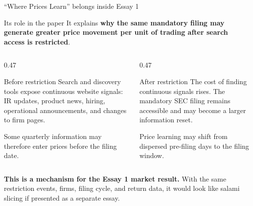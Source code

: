 \documentclass[aspectratio=169,10pt]{beamer}
\begin{document}
\begin{frame}[t]{``Where Prices Learn'' belongs inside Essay 1}
\begin{block}{Its role in the paper}
\large
It explains \textbf{why the same mandatory filing may generate greater price movement per unit of trading after search access is restricted}.
\end{block}

\small
\begin{columns}[T,onlytextwidth]
  \begin{column}{0.47\textwidth}
    \begin{exampleblock}{Before restriction}
      Search and discovery tools expose continuous website signals: IR updates, product news, hiring, operational announcements, and changes to firm pages.

      Some quarterly information may therefore enter prices before the filing date.
    \end{exampleblock}
  \end{column}
  \begin{column}{0.47\textwidth}
    \begin{alertblock}{After restriction}
      The cost of finding continuous signals rises. The mandatory SEC filing remains accessible and may become a larger information reset.

      Price learning may shift from dispersed pre-filing days to the filing window.
    \end{alertblock}
  \end{column}
\end{columns}

\vspace{0.12cm}
\textbf{This is a mechanism for the Essay 1 market result.} With the same restriction events, firms, filing cycle, and return data, it would look like salami slicing if presented as a separate essay.
\end{frame}
\end{document}

